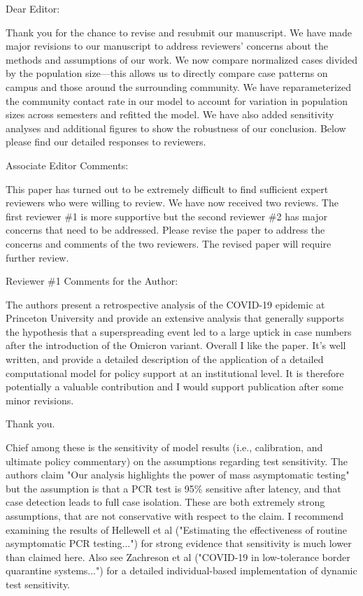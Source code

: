 \documentclass[12pt]{article}
\newcommand{\revtext}{\textsf}
\begin{document}
\noindent Dear Editor:

Thank you for the chance to revise and resubmit our manuscript.
We have made major revisions to our manuscript to address reviewers' concerns about the methods and assumptions of our work.
We now compare normalized cases divided by the population size---this allows us to directly compare case patterns on campus and those around the surrounding community.
We have reparameterized the community contact rate in our model to account for variation in population sizes across semesters and refitted the model.
We have also added sensitivity analyses and additional figures to show the robustness of our conclusion.
Below please find our detailed responses to reviewers.

\revtext{Associate Editor Comments: }

\revtext{This paper has turned out to be extremely difficult to find sufficient expert reviewers who were willing to review. We have now received two reviews. The first reviewer \#1 is more supportive but the second reviewer \#2 has major concerns that need to be addressed. Please revise the paper to address the concerns and comments of the two reviewers. The revised paper will require further review.}

\revtext{Reviewer \#1 Comments for the Author:}

\revtext{The authors present a retrospective analysis of the COVID-19 epidemic at Princeton University and provide an extensive analysis that generally supports the hypothesis that a superspreading event led to a large uptick in case numbers after the introduction of the Omicron variant. Overall I like the paper. It's well written, and provide a detailed description of the application of a detailed computational model for policy support at an institutional level. It is therefore potentially a valuable contribution and I would support publication after some minor revisions.}

Thank you.

\revtext{Chief among these is the sensitivity of model results (i.e., calibration, and ultimate policy commentary) on the assumptions regarding test sensitivity. The authors claim "Our analysis highlights the power of mass asymptomatic testing" but the assumption is that a PCR test is 95\% sensitive after latency, and that case detection leads to full case isolation. These are both extremely strong assumptions, that are not conservative with respect to the claim. I recommend examining the results of Hellewell et al ("Estimating the effectiveness of routine asymptomatic PCR testing...") for strong evidence that sensitivity is much lower than claimed here. Also see Zachreson et al ("COVID-19 in low-tolerance border quarantine systems...") for a detailed individual-based implementation of dynamic test sensitivity.}
\end{document}
